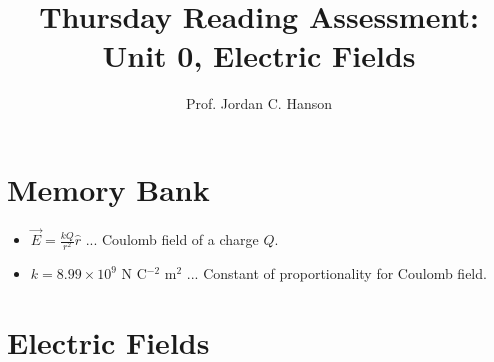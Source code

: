 \documentclass{article}
\begin{document}
\title{Thursday Reading Assessment: Unit 0, Electric Fields}
\author{Prof. Jordan C. Hanson}

\maketitle

\section{Memory Bank}

\large
\begin{itemize}
\item $\vec{E} = \frac{k Q}{r^2} \hat{r}$ ... Coulomb field of a charge $Q$.
\item $k = 8.99 \times 10^{9}$ N C$^{-2}$ m$^{2}$ ... Constant of proportionality for Coulomb field.
\end{itemize}
\normalsize

\section{Electric Fields}
\end{document}
